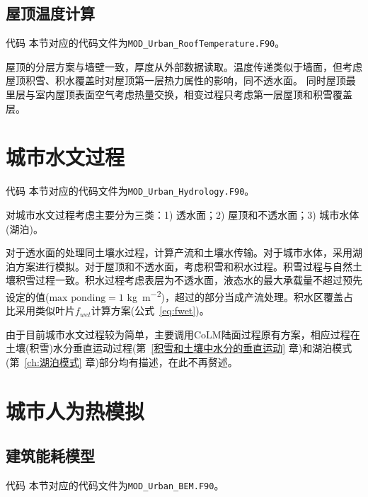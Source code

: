 \subsection{屋顶温度计算}

\begin{mymdframed}{代码}
本节对应的代码文件为\texttt{MOD\_Urban\_RoofTemperature.F90}。
\end{mymdframed}

屋顶的分层方案与墙壁一致，厚度从外部数据读取。温度传递类似于墙面，但考虑屋顶积雪、积水覆盖时对屋顶第一层热力属性的影响，同不透水面。
同时屋顶最里层与室内屋顶表面空气考虑热量交换，相变过程只考虑第一层屋顶和积雪覆盖层。


\section{城市水文过程}

\begin{mymdframed}{代码}
本节对应的代码文件为\texttt{MOD\_Urban\_Hydrology.F90}。
\end{mymdframed}

对城市水文过程考虑主要分为三类：1) 透水面；2) 屋顶和不透水面；3) 城市水体(湖泊)。

对于透水面的处理同土壤水过程，计算产流和土壤水传输。对于城市水体，采用湖泊方案进行模拟。对于屋顶和不透水面，考虑积雪和积水过程。积雪过程与自然土壤积雪过程一致。积水过程考虑表层为不透水面，液态水的最大承载量不超过预先设定的值($\text{max ponding}=1$ \unit{kg.m^{-2}})，超过的部分当成产流处理。积水区覆盖占比采用类似叶片$f_{wet}$计算方案(公式~\eqref{eq:fwet})。

由于目前城市水文过程较为简单，主要调用CoLM陆面过程原有方案，相应过程在土壤(积雪)水分垂直运动过程(第~\ref{积雪和土壤中水分的垂直运动} 章)和湖泊模式(第~\ref{ch:湖泊模式} 章)部分均有描述，在此不再赘述。


\section{城市人为热模拟}

\subsection{建筑能耗模型}\label{建筑能耗模型}

\begin{mymdframed}{代码}
本节对应的代码文件为\texttt{MOD\_Urban\_BEM.F90}。
\end{mymdframed}

